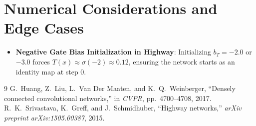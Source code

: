 \documentclass[11pt,a4paper]{article}
\theoremstyle{definition}
\begin{document}
\section{Numerical Considerations and Edge Cases}

\begin{itemize}
    \item \textbf{Negative Gate Bias Initialization in Highway}: Initializing $b_T = -2.0$ or $-3.0$ forces $T(x) \approx \sigma(-2) \approx 0.12$, ensuring the network starts as an identity map at step 0.
\end{itemize}

\begin{thebibliography}{9}
 G.~Huang, Z.~Liu, L.~Van Der Maaten, and K.~Q.~Weinberger, ``Densely connected convolutional networks,'' in \emph{CVPR}, pp.~4700--4708, 2017.
 R.~K.~Srivastava, K.~Greff, and J.~Schmidhuber, ``Highway networks,'' \emph{arXiv preprint arXiv:1505.00387}, 2015.
\end{thebibliography}
\end{document}

